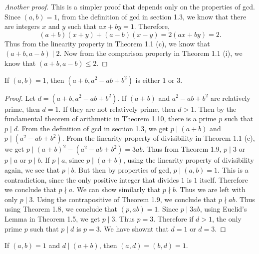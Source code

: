 \begin{proof}[Another proof]
  This is a simpler proof that depends only on the properties of gcd.
  Since \( (a, b) = 1 \), from the definition of gcd in section 1.3,
  we know that there are integers \( x \) and \( y \) such that \( ax
  + by = 1 \). Therefore,
  \[ (a + b)(x + y) + (a - b)(x - y) = 2(ax + by) = 2. \]
  Thus from the linearity property in Theorem 1.1 (c), we know that \(
  (a + b, a - b) \mid 2 \). Now from the comparison property in
  Theorem 1.1 (i), we know that \( (a + b, a - b) \le 2 \).
\end{proof}


\begin{exercise}{1.5}
  If \( (a, b) = 1 \), then \( (a + b, a^2 - ab + b^2) \) is either \(
  1 \) or \( 3 \).
\end{exercise}

\begin{proof}
  Let \( d = (a + b, a^2 - ab + b^2) \). If \( (a + b) \) and \( a^2 -
  ab + b^2 \) are relatively prime, then \( d = 1 \). If they are not
  relatively prime, then \( d > 1 \). Then by the fundamental theorem
  of arithmetic in Theorem 1.10, there is a prime \( p \) such that \(
  p \mid d \). From the definition of gcd in section 1.3, we get \( p
  \mid (a + b) \) and \( p \mid (a^2 - ab + b^2) \). From the
  linearity property of divisibility in Theorem 1.1 (c), we get \( p
  \mid (a + b)^2 - (a^2 - ab + b^2) = 3ab \). Thus from Theorem 1.9,
  \( p \mid 3 \) or \( p \mid a \) or \( p \mid b \). If \( p \mid a
  \), since \( p \mid (a + b) \), using the linearity property of
  divisibility again, we see that \( p \mid b \). But then by
  properties of gcd, \( p \mid (a, b) = 1 \). This is a contradiction,
  since the only positive integer that divides \( 1 \) is \( 1 \)
  itself. Therefore we conclude that \( p \nmid a \). We can show
  similarly that \( p \nmid b \). Thus we are left with only \( p \mid
  3 \). Using the contrapositive of Theorem 1.9, we conclude that \( p
  \nmid ab \). Thus using Theorem 1.8, we conclude that \( (p, ab) = 1
  \). Since \( p \mid 3ab \), using Euclid's Lemma in Theorem 1.5, we
  get \( p \mid 3 \). Thus \( p = 3 \). Therefore if \( d > 1 \), the
  only prime \( p \) such that \( p \mid d \) is \( p = 3 \). We have
  shownt that \( d = 1 \) or \( d = 3 \).
\end{proof}


\begin{exercise}{1.6}
  If \( (a, b) = 1 \) and \( d \mid (a + b) \), then \( (a, d) = (b, d) = 1 \).
\end{exercise}

